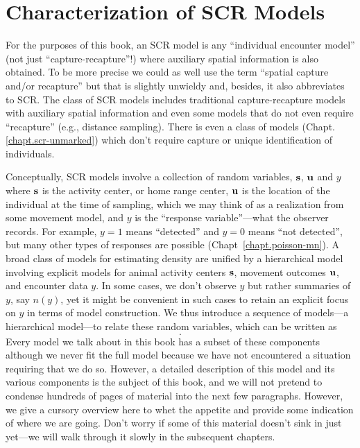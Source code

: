 \section{Characterization of SCR Models}
\label{modeling.sec.characterization}

For the purposes of this book, an SCR model is any ``individual
encounter model'' (not just ``capture-recapture''!) where auxiliary
spatial information is also obtained. To be more precise we could as
well use the term ``spatial capture and/or recapture'' but that is
slightly unwieldy and, besides, it also abbreviates to SCR. The class
of SCR models includes traditional capture-recapture models with
auxiliary spatial information and even some
models that do not even require ``recapture'' (e.g., distance
sampling).  There is even a class of models (Chapt. \ref{chapt.scr-unmarked})
which don't require capture or unique
identification of individuals.

Conceptually, SCR models involve a collection of random
variables, ${\bf s}$, ${\bf u}$ and $y$ where ${\bf s}$ is the
activity center, or home range center, ${\bf u}$ is the location of the
individual at the time of sampling,
which we may think of as a realization from some movement
model, and $y$ is the ``response variable''---what the observer
records. For example, $y=1$ means ``detected'' and $y=0$ means ``not
detected'', but many other types of responses are possible
(Chapt~\ref{chapt.poisson-mn}).
A broad class of models for estimating density are unified by a
hierarchical model involving explicit models for
animal activity centers ${\bf s}$, movement outcomes ${\bf u}$, and
encounter data $y$.  In some cases, we don't observe $y$ but rather
summaries of $y$, say $n(y)$, yet it might be convenient in such cases
to retain an explicit focus on $y$ in terms of model construction.
We thus introduce a sequence of models---a hierarchical model---to
relate these random variables, which can be written as
\begin{equation}
[n(y)|y][y|{\bf u}][{\bf u}|{\bf s}][{\bf s}].
\label{modeling.eq.nyus}
\end{equation}
Every model we talk about in this book has a subset of these
components although we never fit the full model because we have not
encountered a situation requiring that we do so. However,
a detailed  description of this model and its various components
is the subject of this book, and we will not pretend to
condense hundreds of pages of material into the next few
paragraphs. However, we give a cursory overview here to whet the appetite and provide some
indication of where we are going. Don't worry if some of this material
doesn't sink in just yet---we will walk through it
slowly in the subsequent chapters.

